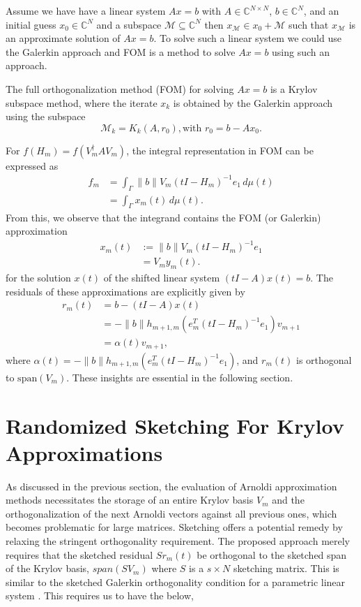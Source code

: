 Assume we have have a linear system $Ax=b$ with $A\in \mathbb{C}^{N\times N}$, $b\in\mathbb{C}^N$, and an initial guess $x_0\in \mathbb{C}^N$ and a subspace $\mathcal{M} \subseteq \mathbb{C}^N$ then $x_{\mathcal{M}}\in x_0 + \mathcal{M}$ such that $x_{\mathcal{M}}$ is an approximate solution of $Ax=b$. To solve such a linear system we could use the Galerkin approach and FOM is a method to solve $Ax=b$ using such an approach.

\begin{definition}
    \label{def:19.1}
     The full orthogonalization method (FOM) for solving $Ax=b$ is a Krylov subspace method, where the iterate $x_k$ is obtained by the Galerkin approach using the subspace
\[
	 \mathcal{M}_k=K_k(A, r_0), \text{with } r_0=b-Ax_0.
\]
\end{definition}

For $f(H_m) = f(V_m^\dagger A V_m)$, the integral representation in FOM can be expressed as
\begin{align}
    f_m &= \int_{\Gamma} \|b\| V_m (tI - H_m)^{-1} e_1 \, d\mu(t) \\
    &= \int_{\Gamma} x_m(t) \, d\mu(t).
    \label{eq:5.4&5.5}
\end{align}
From this, we observe that the integrand contains the FOM (or Galerkin) approximation
\begin{align*}
    x_m(t) &:= \|b\| V_m (tI - H_m)^{-1} e_1 \\
    &= V_m y_m(t).
\end{align*}
for the solution $x(t)$ of the shifted linear system $(tI - A)x(t) = b$. The residuals of these approximations are explicitly given by
\begin{align}
    r_m(t) &= b - (tI - A)x(t) \\
    &= -\|b\| h_{m+1,m} (e_m^{T}(tI - H_m)^{-1} e_1) v_{m+1} \\
    &= \alpha(t) v_{m+1},
    \label{eq:5.6&5.7&5.8}
\end{align}
where $\alpha(t) = -\|b\| h_{m+1,m} (e_m^{T}(tI - H_m)^{-1} e_1)$, and $r_m(t)$ is orthogonal to $\text{span}(V_m)$. These insights are essential in the following section.

\section{Randomized Sketching For Krylov Approximations}
\label{sec:sketching}

As discussed in the previous section, the evaluation of Arnoldi approximation methods necessitates the storage of an entire Krylov basis $V_m$ and the orthogonalization of the next Arnoldi vectors against all previous ones, which becomes problematic for large matrices. Sketching offers a potential remedy by relaxing the stringent orthogonality requirement. The proposed approach merely requires that the sketched residual $Sr_m(t)$ be orthogonal to the sketched span of the Krylov basis, $span(SV_m)$ where $S$ is a $s\times N$ sketching matrix. This is similar to the sketched Galerkin orthogonality condition for a parametric linear system \cite{46}. This requires us to have the below,

